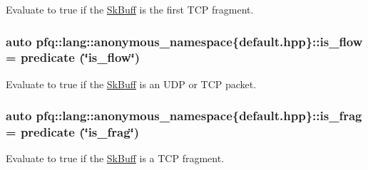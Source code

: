 Evaluate to {\ttfamily true} if the \hyperlink{structpfq_1_1lang_1_1SkBuff}{Sk\+Buff} is the first T\+C\+P fragment. 

\hypertarget{namespacepfq_1_1lang_1_1anonymous__namespace_02default_8hpp_03_ae52890434121a999589d48bccae3c3e2}{
\subsubsection[{is\+\_\+flow}]{\setlength{\rightskip}{0pt plus 5cm}auto pfq\+::lang\+::anonymous\+\_\+namespace\{default.\+hpp\}\+::is\+\_\+flow = {\bf predicate} (\char`\"{}is\+\_\+flow\char`\"{})}}\label{namespacepfq_1_1lang_1_1anonymous__namespace_02default_8hpp_03_ae52890434121a999589d48bccae3c3e2}


Evaluate to {\ttfamily true} if the \hyperlink{structpfq_1_1lang_1_1SkBuff}{Sk\+Buff} is an U\+D\+P or T\+C\+P packet. 

\hypertarget{namespacepfq_1_1lang_1_1anonymous__namespace_02default_8hpp_03_af042e092c925ae6306ae85ae5a56563d}{
\subsubsection[{is\+\_\+frag}]{\setlength{\rightskip}{0pt plus 5cm}auto pfq\+::lang\+::anonymous\+\_\+namespace\{default.\+hpp\}\+::is\+\_\+frag = {\bf predicate} (\char`\"{}is\+\_\+frag\char`\"{})}}\label{namespacepfq_1_1lang_1_1anonymous__namespace_02default_8hpp_03_af042e092c925ae6306ae85ae5a56563d}


Evaluate to {\ttfamily true} if the \hyperlink{structpfq_1_1lang_1_1SkBuff}{Sk\+Buff} is a T\+C\+P fragment. 

